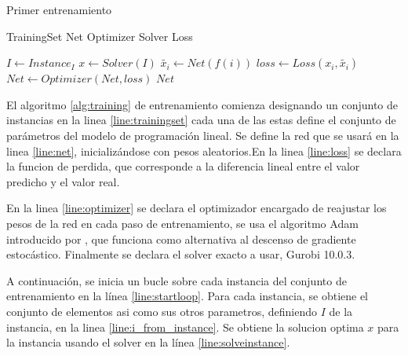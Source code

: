 \documentclass[spanish, a4paper, 12pt, openany,final]{book}
\begin{document}
\begin{algorithm}[H]
	\caption{Primer entrenamiento}\label{alg:training}
	\begin{algorithmic}[1]
		\State TrainingSet  \label{line:trainingset}
		\State Net 		    \label{line:net}
		\State Optimizer    \label{line:optimizer}
		\State Solver       \label{line:solver}
		\State Loss       \label{line:loss}
		
		 \label{line:startloop}
		\State $I \gets Instance_I$ \label{line:i_from_instance}
		\State $x \gets Solver(I)$  \label{line:solveinstance}
		 \label{line:startinnerloop}
		\State $\tilde{x_i} \gets Net(f(i))$   \label{line:prediction}
		\State $loss \gets Loss(x_i,\tilde{x_i})$ \label{line:calculateloss}
		\State $Net \gets Optimizer(Net,loss)$  \label{line:optimizationstep}
		\EndFor \label{line:endinnerloop}
		\EndFor \label{line:endloop}
		\State $Net$  \label{line:trainednet}
	\end{algorithmic}
\end{algorithm}

El algoritmo \ref{alg:training} de entrenamiento comienza designando un conjunto de instancias en la linea \ref{line:trainingset} cada una de las estas define el conjunto de parámetros del modelo de programación lineal. Se define la red que se usará en la linea \ref{line:net}, inicializándose con pesos aleatorios.En la linea \ref{line:loss} se declara la funcion de perdida, que corresponde a la diferencia lineal entre el valor predicho y el valor real.

En la linea \ref{line:optimizer} se declara el optimizador encargado de reajustar los pesos de la red en cada paso de entrenamiento, se usa el algoritmo Adam introducido por \cite{kingma2017adam}, que funciona como alternativa al descenso de gradiente estocástico. Finalmente se declara el solver exacto a usar, Gurobi 10.0.3.

A continuación, se inicia un bucle sobre cada instancia del conjunto de entrenamiento en la línea \ref{line:startloop}. Para cada instancia,
se obtiene el conjunto de elementos asi como sus otros parametros, definiendo $I$ de la instancia, en la linea \ref{line:i_from_instance}.
Se obtiene la solucion optima $x$ para la instancia usando el solver en la línea \ref{line:solveinstance}.
\end{document}
